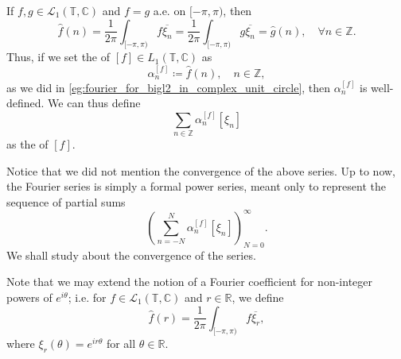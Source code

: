 \documentclass[notoc,notitlepage]{tufte-book}
\begin{document}
\begin{remark}
  If $f, g \in \mathcal{L}_1(\mathbb{T}, \mathbb{C})$
  and $f = g$ a.e. on $[-\pi, \pi)$, then
  \begin{equation*}
    \hat{f}(n) = \frac{1}{2 \pi} \int_{[-\pi, \pi)} f \overline{\xi_n}
    = \frac{1}{2\pi} \int_{[-\pi, \pi)} g \overline{\xi_n}
    = \hat{g}(n),\quad \forall n \in \mathbb{Z}.
  \end{equation*}
  Thus, if we set the 
  of $[f] \in L_1(\mathbb{T}, \mathbb{C})$ as
  \begin{equation*}
    \alpha_n^{[f]} \coloneqq \hat{f}(n), \quad n \in \mathbb{Z},
  \end{equation*}
  as we did in \cref{eg:fourier_for_bigl2_in_complex_unit_circle},
  then $\alpha_n^{[f]}$ is well-defined. We can thus define
  \begin{equation*}
    \sum_{n \in \mathbb{Z}} \alpha_n^{[f]} [\xi_n]
  \end{equation*}
  as the  of $[f]$.
\end{remark}

Notice that we did not mention the convergence of the above series.
Up to now, the Fourier series is simply a formal power series,
meant only to represent the sequence of partial sums
\begin{equation*}
  \left( \sum_{n = -N}^{N} \alpha_n^{[f]} [\xi_n] \right)_{N = 0}^{\infty}.
\end{equation*}
We shall study about the convergence of the series.

Note that we may extend the notion of a Fourier coefficient for
non-integer powers of $e^{i \theta}$;
i.e. for $f \in \mathcal{L}_1(\mathbb{T}, \mathbb{C})$ and $r \in \mathbb{R}$,
we define
\begin{equation*}
  \hat{f}(r) = \frac{1}{2 \pi} \int_{[-\pi, \pi)} f \overline{\xi_r},
\end{equation*}
where $\xi_r(\theta) = e^{ir\theta}$ for all $\theta \in \mathbb{R}$.
\end{document}

